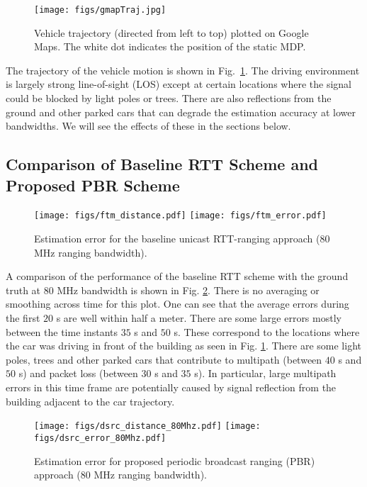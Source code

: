 \documentclass[12pt,journal,final,onecolumn]{IEEEtran}
\theoremstyle{definition}
\theoremstyle{myremark}
\begin{document}
\begin{figure}[htbp]
    \centering 
    \texttt{[image: figs/gmapTraj.jpg]} 

    \caption{Vehicle trajectory (directed from left to top) plotted on Google
    Maps. The white dot indicates the position of the static MDP.}
    \label{fig:gmapTraj}
\end{figure}

The trajectory of the vehicle motion is shown in Fig.~\ref{fig:gmapTraj}.  The
driving environment is largely strong line-of-sight (LOS) except at certain
locations where the signal could be blocked by light poles or trees. There are
also reflections from the ground and other parked cars that can degrade the
estimation accuracy at lower bandwidths. We will see the effects of these in the
sections below.


\subsection{Comparison of Baseline RTT Scheme and Proposed PBR Scheme}
\label{sec:experiments_comparison}

\begin{figure}[htbp]
    \centering 
    \texttt{[image: figs/ftm\_distance.pdf]} 
    \texttt{[image: figs/ftm\_error.pdf]} 

    \caption{Estimation error for the baseline unicast RTT-ranging approach ($80$ MHz ranging
    bandwidth).}
    \label{fig:unicast}
\end{figure}

A comparison of the performance of the baseline RTT scheme with the ground truth
at $80$ MHz bandwidth is shown in Fig. \ref{fig:unicast}. There is no averaging
or smoothing across time for this plot. One can see that the average errors
during the first $20$ s are well within half a meter. There are some large
errors mostly between the time instants $35$ s and $50$ s. These correspond to
the locations where the car was driving in front of the building as seen in Fig.
\ref{fig:gmapTraj}.  There are some light poles, trees and other parked cars
that contribute to multipath (between $40$ s and $50$ s) and packet loss
(between $30$ s and $35$ s). In particular, large multipath errors in this time
frame are potentially caused by signal reflection from the building adjacent to
the car trajectory.

\begin{figure}[htbp]
    \centering 
    \texttt{[image: figs/dsrc\_distance\_80Mhz.pdf]} 
    \texttt{[image: figs/dsrc\_error\_80Mhz.pdf]} 

    \caption{Estimation error for proposed periodic broadcast ranging (PBR) approach
    ($80$ MHz ranging bandwidth).}
    \label{fig:broadcast80}
\end{figure}
\end{document}

